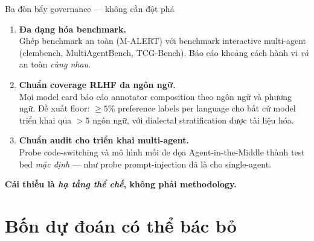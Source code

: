 \documentclass[11pt,aspectratio=169]{beamer}
\newcommand{\takeaway}[1]{%
  \begin{center}
    \colorbox{rsnavy!10}{%
      \begin{minipage}{0.92\textwidth}
        \centering\textbf{#1}
      \end{minipage}}
  \end{center}}
\begin{document}
\begin{frame}{Ba đòn bẩy governance --- không cần đột phá}
    \large
    \begin{enumerate}
        \setlength\itemsep{0.5em}
        \item \textbf{Đa dạng hóa benchmark.}\\
        \normalsize Ghép benchmark an toàn (M-ALERT) với benchmark interactive multi-agent (clembench, MultiAgentBench, TCG-Bench). Báo cáo khoảng cách hành vi \emph{và} an toàn \emph{cùng nhau}.

        \item \textbf{Chuẩn coverage RLHF đa ngôn ngữ.}\\
        \normalsize Mọi model card báo cáo annotator composition theo ngôn ngữ và phương ngữ. Đề xuất floor: $\geq 5\%$ preference labels per language cho bất cứ model triển khai qua $> 5$ ngôn ngữ, với dialectal stratification được tài liệu hóa.

        \item \textbf{Chuẩn audit cho triển khai multi-agent.}\\
        \normalsize Probe code-switching và mô hình mối đe dọa Agent-in-the-Middle thành test bed \emph{mặc định} --- như probe prompt-injection đã là cho single-agent.
    \end{enumerate}
    \vspace{0.3cm}
    \takeaway{Cái thiếu là \emph{hạ tầng thể chế}, không phải methodology.}
\end{frame}

\section{Bốn dự đoán có thể bác bỏ}
\end{document}
